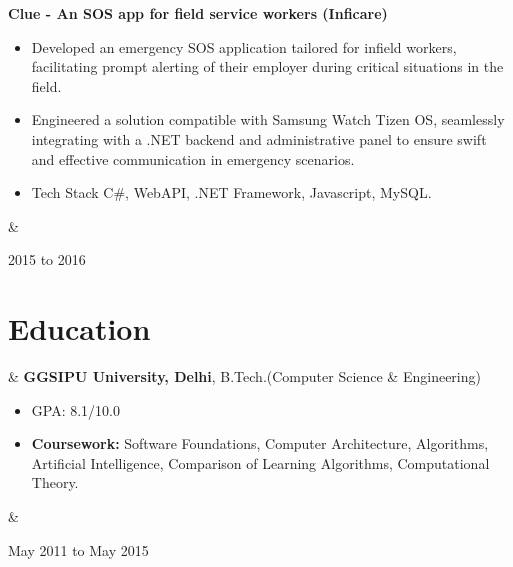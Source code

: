 \documentclass[10pt, letterpaper]{article}
\newenvironment{highlights}{
        \begin{itemize}[
                topsep=0pt,
                parsep=0.10 cm,
                partopsep=0pt,
                itemsep=0pt,
                after=\vspace{-1\baselineskip},
                leftmargin=0.4 cm + 3pt
            ]
    }{
        \end{itemize}
    } %
\let\originalTabularx\tabularx
\let\originalEndTabularx\endtabularx
\renewenvironment{tabularx}{\bgroup\centering\originalTabularx}{\originalEndTabularx\par\egroup}
\begin{document}
        \vspace{0.2 cm}
        \begin{tabularx}{
            \textwidth-0.4 cm-0.13cm
        }{
            K{0.2 cm}
            R{4.1 cm}
        }
            \textbf{Clue - An SOS app for field service workers (Inficare)}

            \vspace{0.10 cm}

            \begin{highlights}
                \item Developed an emergency SOS application tailored for infield workers, facilitating prompt alerting of their employer during critical situations in the field.
                \item Engineered a solution compatible with Samsung Watch Tizen OS, seamlessly integrating with a .NET backend and administrative panel to ensure swift and effective communication in emergency scenarios.
                \item Tech Stack C\#, WebAPI, .NET Framework, Javascript, MySQL.
            \end{highlights}
            &
            

            2015 to 2016
        \end{tabularx}



    
    \section{Education}

        \begin{tabularx}{
            \textwidth-0.4 cm-0.13cm
        }{
            L{0.85cm}
            K{0.2 cm}
            R{4.1 cm}
        }
            \textbf{}
            &
            \textbf{GGSIPU University, Delhi}, B.Tech.(Computer Science \& Engineering)

            \vspace{0.10 cm}

            \begin{highlights}
                \item GPA: 8.1/10.0
                \item \textbf{Coursework:} Software Foundations, Computer Architecture, Algorithms, Artificial Intelligence, Comparison of Learning Algorithms, Computational Theory.
            \end{highlights}
            &
            

            May 2011 to May 2015
        \end{tabularx}
\end{document}
